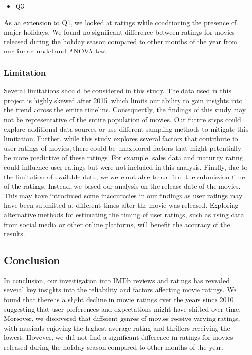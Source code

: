 \documentclass[
]{article}
\providecommand{\tightlist}{%
  \setlength{\itemsep}{0pt}\setlength{\parskip}{0pt}}
\begin{document}
\begin{itemize}
\tightlist
\item
  Q3
\end{itemize}

As an extension to Q1, we looked at ratings while condtioning the
presence of major holidays. We found no significant difference between
ratings for movies released during the holiday season compared to other
months of the year from our linear model and ANOVA test.

\hypertarget{limitation}{%
\subsubsection{Limitation}\label{limitation}}

Several limitations should be considered in this study. The data used in
this project is highly skewed after 2015, which limits our ability to
gain insights into the trend across the entire timeline. Consequently,
the findings of this study may not be representative of the entire
population of movies. Our future steps could explore additional data
sources or use different sampling methods to mitigate this limitation.
Further, while this study explores several factors that contribute to
user ratings of movies, there could be unexplored factors that might
potentially be more predictive of these ratings. For example, sales data
and maturity rating could influence user ratings but were not included
in this analysis. Finally, due to the limitation of available data, we
were not able to confirm the submission time of the ratings. Instead, we
based our analysis on the release date of the movies. This may have
introduced some inaccuracies in our findings as user ratings may have
been submitted at different times after the movie was released.
Exploring alternative methods for estimating the timing of user ratings,
such as using data from social media or other online platforms, will
benefit the accuracy of the results.

\hypertarget{conclusion}{%
\subsection{Conclusion}\label{conclusion}}

In conclusion, our investigation into IMDb reviews and ratings has
revealed several key insights into the reliability and factors affecting
movie ratings. We found that there is a slight decline in movie ratings
over the years since 2010, suggesting that user preferences and
expectations might have shifted over time. Moreover, we discovered that
different genres of movies receive varying ratings, with musicals
enjoying the highest average rating and thrillers receiving the lowest.
However, we did not find a significant difference in ratings for movies
released during the holiday season compared to other months of the year.
\end{document}
